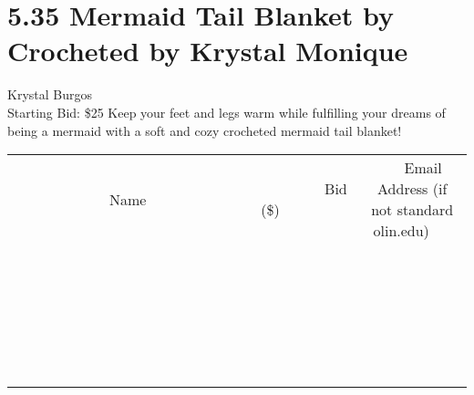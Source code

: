 \documentclass[11pt]{article}
\begin{document}
\section*{5.35 Mermaid Tail Blanket by Crocheted by Krystal Monique}
Krystal Burgos
\\
Starting Bid: \$25
\newline
Keep your feet and legs warm while fulfilling your dreams of being a mermaid with  a soft and cozy crocheted mermaid tail blanket!
\\[6ex]
\begin{tabular}{c c c}
~~~~~~~~~~~~~Name~~~~~~~~~~~~~ & ~~~~~~~~~Bid (\$)~~~~~~~~~  & ~~~Email Address (if not standard olin.edu)~~~\\
 & & \\
\hline
 & & \\
\hline
 & & \\
\hline
 & & \\
\hline
 & & \\
\hline
 & & \\
\hline
 & & \\
\hline
 & & \\
\hline
 & & \\
\hline
 & & \\
\hline
 & & \\
\hline
 & & \\
\hline
 & & \\
\hline
 & & \\
\hline
 & & \\
\hline
 & & \\
\hline
 & & \\
\hline
 & & \\
\hline
 & & \\
\hline
 & & \\
\hline
 & & \\
\hline
 & & \\
\hline
 & & \\
\hline
 & & \\
\hline
 & & \\
\hline
 & & \\
\hline
\end{tabular}
\newpage
\end{document}
